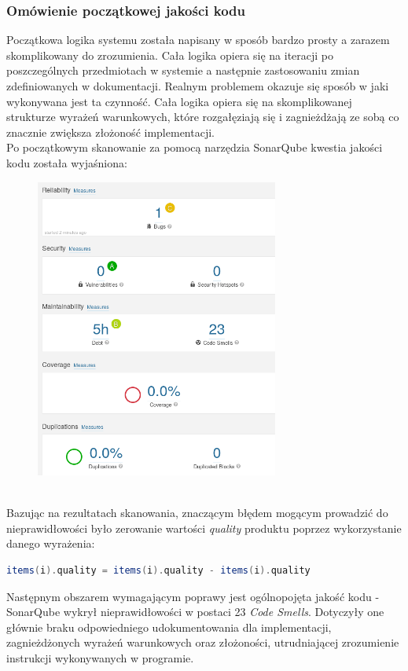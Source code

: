 \documentclass[a4paper, 11pt]{article}
\begin{document}
\subsubsection{Omówienie początkowej jakości kodu}
Początkowa logika systemu została napisany w sposób bardzo prosty a zarazem skomplikowany do zrozumienia. Cała logika opiera się na iteracji po poszczególnych przedmiotach w systemie a następnie zastosowaniu zmian zdefiniowanych w dokumentacji. Realnym problemem okazuje się sposób w jaki wykonywana jest ta czynność. Cała logika opiera się na skomplikowanej strukturze wyrażeń warunkowych, które rozgałęziają się i zagnieżdżają ze sobą co znacznie zwiększa złożoność implementacji.\\
Po początkowym skanowanie za pomocą narzędzia SonarQube kwestia jakości kodu została wyjaśniona:
\begin{figure}[!tbh]
\includegraphics[width=8cm]{v01_ov}
\centering
\end{figure}\\
Bazując na rezultatach skanowania, znaczącym błędem mogącym prowadzić do nieprawidłowości było zerowanie wartości \textit{quality} produktu poprzez wykorzystanie danego wyrażenia:
\begin{lstlisting}[language=scala]
items(i).quality = items(i).quality - items(i).quality
\end{lstlisting}
Następnym obszarem wymagającym poprawy jest ogólnopojęta jakość kodu - SonarQube wykrył nieprawidłowości w postaci 23 \textit{Code Smells}. Dotyczyły one głównie braku odpowiedniego udokumentowania dla implementacji, zagnieżdżonych wyrażeń warunkowych oraz złożoności, utrudniającej zrozumienie instrukcji wykonywanych w programie.
\end{document}
